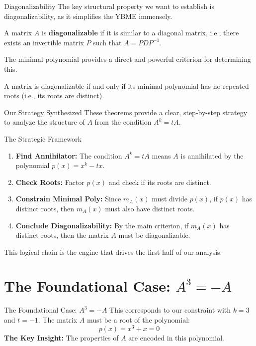 \documentclass{beamer}
\begin{document}
\begin{frame}{Diagonalizability}
  The key structural property we want to establish is diagonalizability, as it simplifies the YBME immensely.
  \begin{definition}
    A matrix $A$ is \textbf{diagonalizable} if it is similar to a diagonal matrix, i.e., there exists an invertible matrix $P$ such that $A = PDP^{-1}$.
  \end{definition}
  \vfill
  The minimal polynomial provides a direct and powerful criterion for determining this.
  \begin{theorem}
    A matrix is diagonalizable if and only if its minimal polynomial has no repeated roots (i.e., its roots are distinct).
  \end{theorem}
\end{frame}

\begin{frame}{Our Strategy Synthesized}
  These theorems provide a clear, step-by-step strategy to analyze the structure of $A$ from the condition $A^k=tA$.
  \begin{alertblock}{The Strategic Framework}
    \begin{enumerate}
        \item \textbf{Find Annihilator:} The condition $A^k=tA$ means $A$ is annihilated by the polynomial $p(x) = x^k - tx$.
        \pause
        \item \textbf{Check Roots:} Factor $p(x)$ and check if its roots are distinct.
        \pause
        \item \textbf{Constrain Minimal Poly:} Since $m_A(x)$ must divide $p(x)$, if $p(x)$ has distinct roots, then $m_A(x)$ must also have distinct roots.
        \pause
        \item \textbf{Conclude Diagonalizability:} By the main criterion, if $m_A(x)$ has distinct roots, then the matrix $A$ must be diagonalizable.
    \end{enumerate}
  \end{alertblock}
  This logical chain is the engine that drives the first half of our analysis.
\end{frame}

\section{The Foundational Case: $A^3 = -A$}

\begin{frame}{The Foundational Case: $A^3 = -A$}
  This corresponds to our constraint with $k=3$ and $t=-1$.
  \vfill
  The matrix $A$ must be a root of the polynomial:
  \[ p(x) = x^3 + x = 0 \]
  \vfill
  \textbf{The Key Insight:} The properties of $A$ are encoded in this polynomial.
\end{frame}
\end{document}
